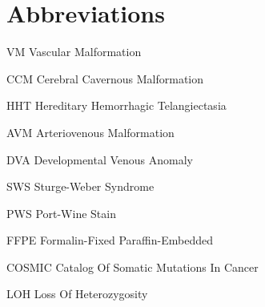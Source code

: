 \abbreviations



\section*{Abbreviations}

\begin{symbollist}
	\item[VM] Vascular Malformation
	\item[CCM] Cerebral Cavernous Malformation
	\item[HHT] Hereditary Hemorrhagic Telangiectasia
	\item[AVM] Arteriovenous Malformation
	\item[DVA] Developmental Venous Anomaly
	\item[SWS] Sturge-Weber Syndrome
	\item[PWS] Port-Wine Stain
	\item[FFPE] Formalin-Fixed Paraffin-Embedded
	\item[COSMIC] Catalog Of Somatic Mutations In Cancer
	\item[LOH] Loss Of Heterozygosity
\end{symbollist}
